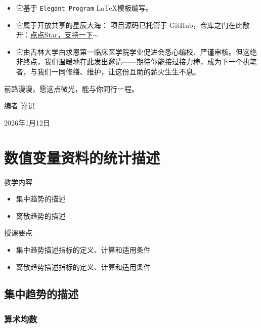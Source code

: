 \documentclass[lang=cn,10pt]{elegantbook}
\begin{document}
\begin{itemize}
    \item 它基于 \verb|Elegant Program| \LaTeX 模板编写。
    \item 它属于开放共享的星辰大海： 项目源码已托管于 GitHub，仓库之门在此敞开：\href{https://github.com/Mading706/Introduction-to-Medical-Research-and-Essay-Writing}{点点Star，支持一下$\sim$}
    \item 它由吉林大学白求恩第一临床医学院学业促进会悉心编校、严谨审核。但这绝非终点，我们温暖地在此发出邀请——期待你能接过接力棒，成为下一个执笔者，与我们一同修缮、维护，让这份互助的薪火生生不息。
\end{itemize}


\vspace{0.4cm}

前路漫漫，愿这点微光，能与你同行一程。

\hfill 编者 谨识

\hfill 2026年1月12日


\chapter{数值变量资料的统计描述}

\begin{introduction}
    \item 教学内容
    \begin{itemize}
        \item 集中趋势的描述
        \item 离散趋势的描述


    \end{itemize}
    \item 授课要点
    \begin{itemize}
        \item 集中趋势描述指标的定义、计算和适用条件
        \item 离散趋势描述指标的定义、计算和适用条件

    \end{itemize}
\end{introduction}

\section{集中趋势的描述}

\subsection{算术均数}
\end{document}
